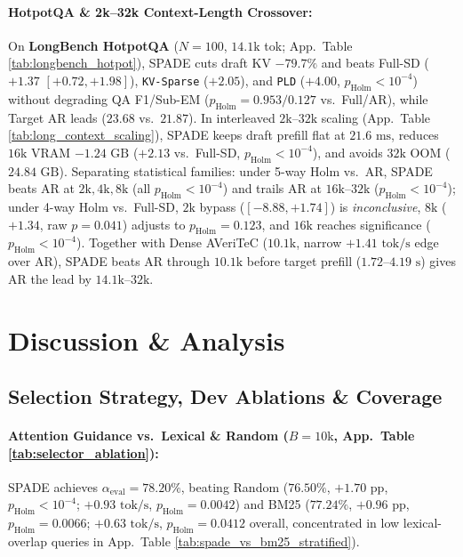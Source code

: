 \documentclass[11pt]{article}
\begin{document}
\paragraph{HotpotQA \& 2k--32k Context-Length Crossover:}
On \textbf{LongBench HotpotQA} ($N=100$, $14.1\text{k}$ tok; App.\ Table \ref{tab:longbench_hotpot}), SPADE cuts draft KV $-79.7\%$ and beats Full-SD ($+1.37$ $[+0.72, +1.98]$), \texttt{KV-Sparse} ($+2.05$), and \texttt{PLD} ($+4.00$, $p_{\text{Holm}}<10^{-4}$) without degrading QA F1/Sub-EM ($p_{\text{Holm}}=0.953/0.127$ vs.\ Full/AR), while Target AR leads ($23.68$ vs.\ $21.87$). In interleaved $2\text{k}$--$32\text{k}$ scaling (App.\ Table \ref{tab:long_context_scaling}), SPADE keeps draft prefill flat at $21.6\text{ ms}$, reduces $16\text{k}$ VRAM $-1.24\text{ GB}$ ($+2.13$ vs.\ Full-SD, $p_{\text{Holm}}<10^{-4}$), and avoids $32\text{k}$ OOM ($24.84\text{ GB}$). Separating statistical families: under 5-way Holm vs.\ AR, SPADE beats AR at $2\text{k}, 4\text{k}, 8\text{k}$ (all $p_{\text{Holm}}<10^{-4}$) and trails AR at $16\text{k}$--$32\text{k}$ ($p_{\text{Holm}}<10^{-4}$); under 4-way Holm vs.\ Full-SD, $2\text{k}$ bypass ($[-8.88, +1.74]$) is \textit{inconclusive}, $8\text{k}$ ($+1.34$, raw $p=0.041$) adjusts to $p_{\text{Holm}}=0.123$, and $16\text{k}$ reaches significance ($p_{\text{Holm}}<10^{-4}$). Together with Dense AVeriTeC ($10.1\text{k}$, narrow $+1.41\text{ tok/s}$ edge over AR), SPADE beats AR through $10.1\text{k}$ before target prefill ($1.72\text{--}4.19\text{ s}$) gives AR the lead by $14.1\text{k}$--$32\text{k}$.

\section{Discussion \& Analysis}
\label{sec:discussion}

\subsection{Selection Strategy, Dev Ablations \& Coverage}
\label{sec:ablation_analysis}
\paragraph{Attention Guidance vs.\ Lexical \& Random ($B=10\text{k}$, App.\ Table \ref{tab:selector_ablation}):}
SPADE achieves $\alpha_{\text{eval}}=\mathbf{78.20\%}$, beating Random ($76.50\%$, $+1.70\text{ pp}$, $p_{\text{Holm}}<10^{-4}$; $+0.93\text{ tok/s}$, $p_{\text{Holm}}=0.0042$) and BM25 ($77.24\%$, $+0.96\text{ pp}$, $p_{\text{Holm}}=0.0066$; $+0.63\text{ tok/s}$, $p_{\text{Holm}}=0.0412$ overall, concentrated in low lexical-overlap queries in App.\ Table \ref{tab:spade_vs_bm25_stratified}).
\end{document}
